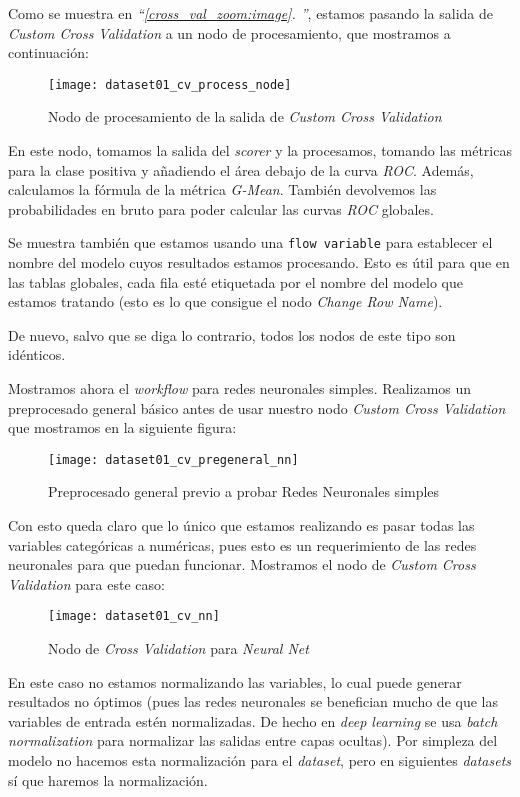 \documentclass[11pt]{article}
\newcommand{\customcite}[1]{\emph{``\ref{#1}. \nameref{#1}''}}
\begin{document}
Como se muestra en \customcite{cross_val_zoom:image}, estamos pasando la salida de \emph{Custom Cross Validation} a un nodo de procesamiento, que mostramos a continuación:

\begin{figure}[H]
    \centering
    \texttt{[image: dataset01\_cv\_process\_node]}
    \caption{Nodo de procesamiento de la salida de \emph{Custom Cross Validation}}
\end{figure}

En este nodo, tomamos la salida del \emph{scorer} y la procesamos, tomando las métricas para la clase positiva y añadiendo el área debajo de la curva \emph{ROC}. Además, calculamos la fórmula de la métrica \emph{G-Mean}. También devolvemos las probabilidades en bruto para poder calcular las curvas \emph{ROC} globales.

Se muestra también que estamos usando una \lstinline{flow variable} para establecer el nombre del modelo cuyos resultados estamos procesando. Esto es útil para que en las tablas globales, cada fila esté etiquetada por el nombre del modelo que estamos tratando (esto es lo que consigue el nodo \emph{Change Row Name}).

De nuevo, salvo que se diga lo contrario, todos los nodos de este tipo son idénticos.

Mostramos ahora el \emph{workflow} para redes neuronales simples. Realizamos un preprocesado general básico antes de usar nuestro nodo \emph{Custom Cross Validation} que mostramos en la siguiente figura:

\begin{figure}[H]
    \centering
    \texttt{[image: dataset01\_cv\_pregeneral\_nn]}
    \caption{Preprocesado general previo a probar Redes Neuronales simples}
\end{figure}

Con esto queda claro que lo único que estamos realizando es pasar todas las variables categóricas a numéricas, pues esto es un requerimiento de las redes neuronales para que puedan funcionar. Mostramos el nodo de \emph{Custom Cross Validation} para este caso:

\begin{figure}[H]
    \centering
    \texttt{[image: dataset01\_cv\_nn]}
    \caption{Nodo de \emph{Cross Validation} para \emph{Neural Net}}
\end{figure}

En este caso no estamos normalizando las variables, lo cual puede generar resultados no óptimos (pues las redes neuronales se benefician mucho de que las variables de entrada estén normalizadas. De hecho en \emph{deep learning} se usa \emph{batch normalization} para normalizar las salidas entre capas ocultas). Por simpleza del modelo no hacemos esta normalización para el \emph{dataset}, pero en siguientes \emph{datasets} sí que haremos la normalización.
\end{document}
